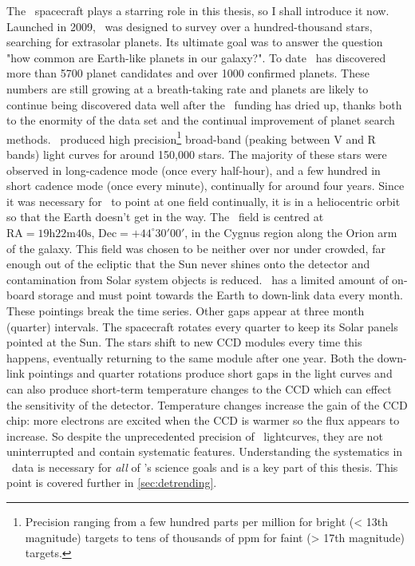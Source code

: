 The \kepler\ spacecraft plays a starring role in this thesis, so I shall
introduce it now.
Launched in 2009, \kepler\ was designed to survey over a hundred-thousand
stars, searching for extrasolar planets.
Its ultimate goal was to answer the question "how common are Earth-like
planets in our galaxy?".
To date \kepler\ has discovered more than 5700 planet candidates and over 1000
confirmed planets.
These numbers are still growing at a breath-taking rate and planets are likely
to continue being discovered data well after the \kepler\ funding has dried
up, thanks both to the enormity of the data set and the continual improvement
of planet search methods.
\kepler\ produced high precision\footnote{Precision ranging from a few hundred
parts per million for bright (< 13th magnitude) targets to tens of thousands
of ppm for faint (> 17th magnitude) targets.} broad-band (peaking between V
and R bands) light curves for around 150,000 stars.
The majority of these stars were observed in long-cadence mode (once every
half-hour), and a few hundred in short cadence mode (once every minute),
continually for around four years.
Since it was necessary for \kepler\ to point at one field continually, it is
in a heliocentric orbit so that the Earth doesn't get in the way.
The \kepler\ field is centred at $\mathrm{RA} = 19\mathrm{h} 22\mathrm{m}
40\mathrm{s}$, $\mathrm{Dec} = +44^\circ30' 00'$, in the Cygnus region along
the Orion arm of the galaxy.
This field was chosen to be neither over nor under crowded, far enough out of
the ecliptic that the Sun never shines onto the detector and contamination
from Solar system objects is reduced.
\kepler\ has a limited amount of on-board storage and must point towards the
Earth to down-link data every month.
These pointings break the time series.
Other gaps appear at three month (quarter) intervals.
The spacecraft rotates every quarter to keep its Solar panels pointed at the
Sun.
The stars shift to new CCD modules every time this happens, eventually
returning to the same module after one year.
Both the down-link pointings and quarter rotations produce short gaps in the
light curves and can also produce short-term temperature changes to the CCD
which can effect the sensitivity of the detector.
Temperature changes increase the gain of the CCD chip: more electrons are
excited when the CCD is warmer so the flux appears to increase.
So despite the unprecedented precision of \kepler\ lightcurves, they are not
uninterrupted and contain systematic features.
Understanding the systematics in \kepler\ data is necessary for {\it all} of
\kepler's science goals and is a key part of this thesis.
This point is covered further in \textsection \ref{sec:detrending}.

